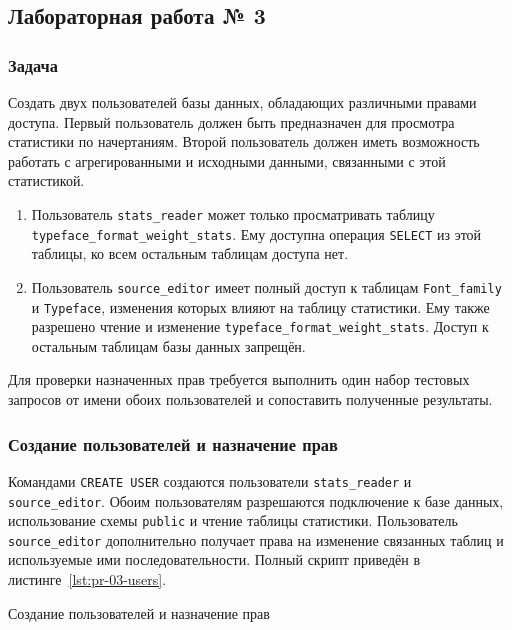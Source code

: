 \subsection{Лабораторная работа № 3}

\subsubsection{Задача}

Создать двух пользователей базы данных, обладающих различными правами доступа.
Первый пользователь должен быть предназначен для просмотра статистики по
начертаниям. Второй пользователь должен иметь возможность работать с
агрегированными и исходными данными, связанными с этой статистикой.

\begin{enumerate}
    \item Пользователь \texttt{stats_reader} может только
    просматривать таблицу
    \texttt{typeface_format_weight_stats}. Ему доступна операция
    \texttt{SELECT} из этой таблицы, ко всем остальным таблицам
    доступа нет.
    \item Пользователь \texttt{source_editor} имеет полный доступ
    к таблицам \texttt{Font_family} и
    \texttt{Typeface}, изменения которых влияют на таблицу
    статистики. Ему также разрешено чтение и изменение
    \texttt{typeface_format_weight_stats}. Доступ к остальным
    таблицам базы данных запрещён.
\end{enumerate}

Для проверки назначенных прав требуется выполнить один набор тестовых запросов
от имени обоих пользователей и сопоставить полученные результаты.

\subsubsection{Создание пользователей и назначение прав}

Командами \texttt{CREATE USER} создаются
пользователи \texttt{stats_reader} и
\texttt{source_editor}. Обоим пользователям разрешаются подключение
к базе данных, использование схемы \texttt{public} и чтение таблицы
статистики. Пользователь \texttt{source_editor} дополнительно
получает права на изменение связанных таблиц и используемые ими
последовательности. Полный скрипт приведён в
листинге~\ref{lst:pr-03-users}.

{Создание пользователей и назначение прав}
{\label{lst:pr-03-users}}

